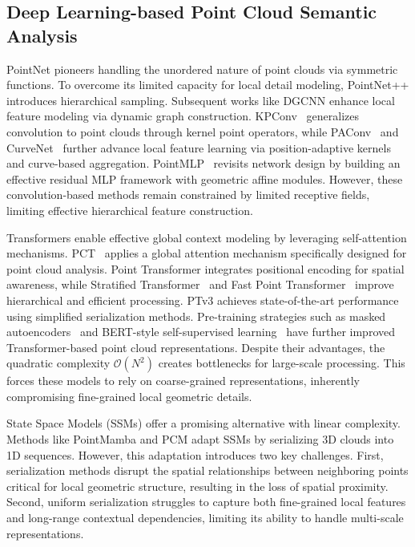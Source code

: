 \documentclass[letterpaper,journal]{IEEEtran}
\begin{document}
\subsection{Deep Learning-based Point Cloud Semantic Analysis}
PointNet \cite{pointnet} pioneers handling the unordered nature of point clouds via symmetric functions. To overcome its limited capacity for local detail modeling, PointNet++ \cite{PointNet++} introduces hierarchical sampling. Subsequent works like DGCNN \cite{DGCNN} enhance local feature modeling via dynamic graph construction. KPConv~\cite{KPConv} generalizes convolution to point clouds through kernel point operators, while PAConv~\cite{paconv} and CurveNet~\cite{curvenet} further advance local feature learning via position-adaptive kernels and curve-based aggregation. PointMLP~\cite{pointmlp} revisits network design by building an effective residual MLP framework with geometric affine modules. However, these convolution-based methods remain constrained by limited receptive fields, limiting effective hierarchical feature construction.

Transformers enable effective global context modeling by leveraging self-attention mechanisms. PCT~\cite{PCT} applies a global attention mechanism specifically designed for point cloud analysis. Point Transformer \cite{pt} integrates positional encoding for spatial awareness, while Stratified Transformer~\cite{stratified_transformer} and Fast Point Transformer~\cite{fast_point_transformer} improve hierarchical and efficient processing. PTv3 \cite{ptv3} achieves state-of-the-art performance using simplified serialization methods. Pre-training strategies such as masked autoencoders~\cite{pointmae} and BERT-style self-supervised learning~\cite{Point-BERT} have further improved Transformer-based point cloud representations. Despite their advantages, the quadratic complexity $\mathcal{O}(N^2)$ creates bottlenecks for large-scale processing. This forces these models to rely on coarse-grained representations, inherently compromising fine-grained local geometric
details.

State Space Models (SSMs) \cite{Mamba} offer a promising alternative with linear complexity. Methods like PointMamba \cite{PointMamba} and PCM \cite{pcm} adapt SSMs by serializing 3D clouds into 1D sequences.   However, this adaptation introduces two key challenges. First,
serialization methods disrupt the spatial relationships between
neighboring points critical for local geometric structure, resulting in
the loss of spatial proximity. Second, uniform serialization struggles to
capture both fine-grained local features and long-range contextual
dependencies, limiting its ability to handle multi-scale representations.
\end{document}
